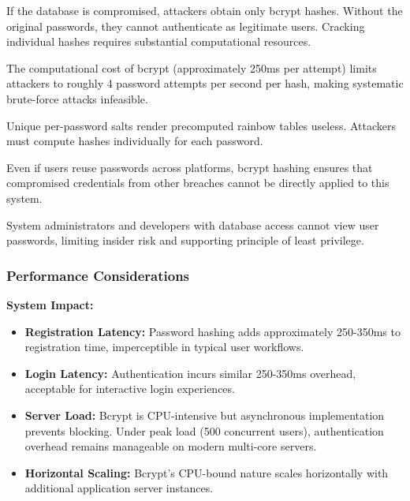 \documentclass[12pt,a4paper]{article}
\begin{document}
\begin{description}[leftmargin=2em, itemsep=8pt, style=nextline]
    \item[\textbf{Database Breach:}] If the database is compromised, attackers obtain only bcrypt hashes. Without the original passwords, they cannot authenticate as legitimate users. Cracking individual hashes requires substantial computational resources.
    
    \item[\textbf{Brute-Force Attacks:}] The computational cost of bcrypt (approximately 250ms per attempt) limits attackers to roughly 4 password attempts per second per hash, making systematic brute-force attacks infeasible.
    
    \item[\textbf{Rainbow Table Attacks:}] Unique per-password salts render precomputed rainbow tables useless. Attackers must compute hashes individually for each password.
    
    \item[\textbf{Credential Stuffing:}] Even if users reuse passwords across platforms, bcrypt hashing ensures that compromised credentials from other breaches cannot be directly applied to this system.
    
    \item[\textbf{Insider Threats:}] System administrators and developers with database access cannot view user passwords, limiting insider risk and supporting principle of least privilege.
\end{description}

\subsubsection{Performance Considerations}

\textbf{System Impact:}

\begin{itemize}[leftmargin=2em, itemsep=6pt]
    \item \textbf{Registration Latency:} Password hashing adds approximately 250-350ms to registration time, imperceptible in typical user workflows.
    \item \textbf{Login Latency:} Authentication incurs similar 250-350ms overhead, acceptable for interactive login experiences.
    \item \textbf{Server Load:} Bcrypt is CPU-intensive but asynchronous implementation prevents blocking. Under peak load (500 concurrent users), authentication overhead remains manageable on modern multi-core servers.
    \item \textbf{Horizontal Scaling:} Bcrypt's CPU-bound nature scales horizontally with additional application server instances.
\end{itemize}
\end{document}
